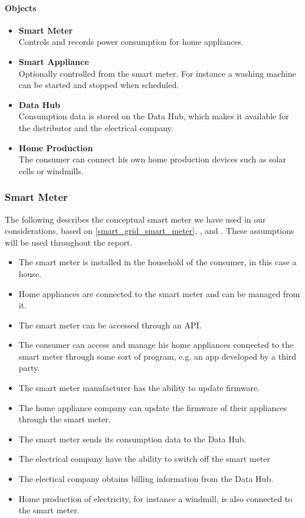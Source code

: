 \paragraph{Objects}
\begin{itemize}
\item \textbf{Smart Meter}\\ Controls and records power consumption for home appliances.
\item \textbf{Smart Appliance}\\ Optionally controlled from the smart meter.
For instance a washing machine can be started and stopped when scheduled.
\item \textbf{Data Hub}\\ Consumption data is stored on the Data Hub, which makes it available for the distributor and the electrical company.
\item \textbf{Home Production}\\ The consumer can connect his own home production devices such as solar cells or windmills.
\end{itemize}

\subsubsection{Smart Meter}
The following describes the conceptual smart meter we have used in our considerations, based on \cref{smart_grid_smart_meter}, \citet{tdlm}, and \citet{smart_meter_survey}.
These assumptions will be used throughout the report.
\begin{itemize}
	\item The smart meter is installed in the household of the consumer, in this case a house.
	\item Home appliances are connected to the smart meter and can be managed from it.
	\item The smart meter can be accessed through an API.
	\item The consumer can access and manage his home appliances connected to the smart meter through some sort of program, e.g. an app developed by a third party.
	\item The smart meter manufacturer has the ability to update firmware. 
	\item The home appliance company can update the firmware of their appliances through the smart meter.
	\item The smart meter sends its consumption data to the Data Hub.
	\item The electrical company have the ability to switch off the smart meter 
	\item The electical company obtains billing information from the Data Hub.
	\item Home production of electricity, for instance a windmill, is also connected to the smart meter.
\end{itemize}

